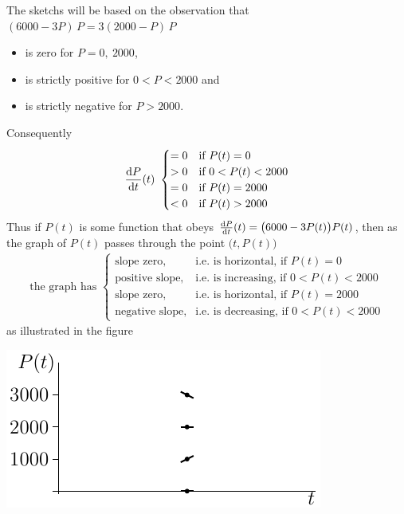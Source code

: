 \noindent The sketchs will be based on the observation that
$(6000-3P)\,P=3(2000-P)\,P$
\begin{itemize} \itemsep1pt \parskip0pt
  \item is zero for $P=0,\ 2000$,
  \item is strictly positive for $0<P<2000$ and
  \item is strictly negative for $P>2000$.
\end{itemize}
Consequently
\begin{align*}
  \diff{P}{t}(t)\ \begin{cases}
                       =0  & \text{if }P(t)=0 \\
                        >0 & \text{if }0<P(t)<2000 \\
                        =0 & \text{if }P(t)=2000 \\
                        <0 & \text{if }P(t)>2000
                  \end{cases}
\end{align*}
Thus if $P(t)$ is some function that obeys
$\diff{P}{t}(t)=\big(6000-3P(t)\big)P(t)$, then as the graph of $P(t)$
passes through the point $\big(t,P(t)\big)$
\begin{align*}
\text{the graph has }
  \begin{cases}
      \text{slope zero,}& \text{i.e. is horizontal, \ \ if }P(t)=0  \\
      \text{positive slope,}& \text{i.e. is increasing, \ \ if }
                                                       0<P(t)<2000  \\
     \text{slope zero,}& \text{i.e. is horizontal, \ \ if }P(t)=2000  \\
          \text{negative slope,}& \text{i.e. is decreasing, \ \ if }0<P(t)<2000
  \end{cases}
\end{align*}
as illustrated in the figure
\begin{efig}
\begin{center}
  \includegraphics{pop1}
\end{center}
\end{efig}
